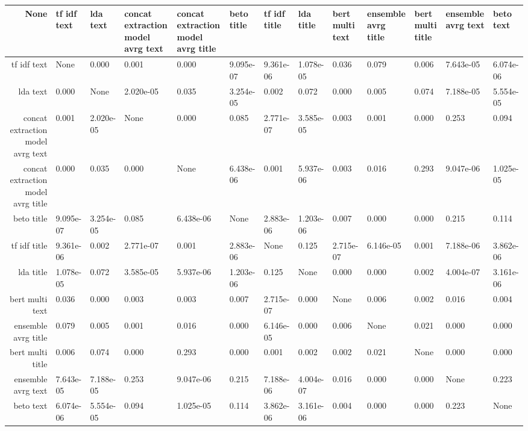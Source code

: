 \begin{tabular}{|r|l|l|l|l|l|l|l|l|l|l|l|l|}
  \hline
  None & tf idf text & lda text & concat extraction model avrg text & concat extraction model avrg title & beto title & tf idf title & lda title & bert multi text & ensemble avrg title & bert multi title & ensemble avrg text & beto text \\ 
  \hline
  tf idf text & None & 0.000 & 0.001 & 0.000 & 9.095e-07 & 9.361e-06 & 1.078e-05 & 0.036 & 0.079 & 0.006 & 7.643e-05 & 6.074e-06 \\ 
  \hline
  lda text & 0.000 & None & 2.020e-05 & 0.035 & 3.254e-05 & 0.002 & 0.072 & 0.000 & 0.005 & 0.074 & 7.188e-05 & 5.554e-05 \\ 
  \hline
  concat extraction model avrg text & 0.001 & 2.020e-05 & None & 0.000 & 0.085 & 2.771e-07 & 3.585e-05 & 0.003 & 0.001 & 0.000 & 0.253 & 0.094 \\ 
  \hline
  concat extraction model avrg title & 0.000 & 0.035 & 0.000 & None & 6.438e-06 & 0.001 & 5.937e-06 & 0.003 & 0.016 & 0.293 & 9.047e-06 & 1.025e-05 \\ 
  \hline
  beto title & 9.095e-07 & 3.254e-05 & 0.085 & 6.438e-06 & None & 2.883e-06 & 1.203e-06 & 0.007 & 0.000 & 0.000 & 0.215 & 0.114 \\ 
  \hline
  tf idf title & 9.361e-06 & 0.002 & 2.771e-07 & 0.001 & 2.883e-06 & None & 0.125 & 2.715e-07 & 6.146e-05 & 0.001 & 7.188e-06 & 3.862e-06 \\ 
  \hline
  lda title & 1.078e-05 & 0.072 & 3.585e-05 & 5.937e-06 & 1.203e-06 & 0.125 & None & 0.000 & 0.000 & 0.002 & 4.004e-07 & 3.161e-06 \\ 
  \hline
  bert multi text & 0.036 & 0.000 & 0.003 & 0.003 & 0.007 & 2.715e-07 & 0.000 & None & 0.006 & 0.002 & 0.016 & 0.004 \\ 
  \hline
  ensemble avrg title & 0.079 & 0.005 & 0.001 & 0.016 & 0.000 & 6.146e-05 & 0.000 & 0.006 & None & 0.021 & 0.000 & 0.000 \\ 
  \hline
  bert multi title & 0.006 & 0.074 & 0.000 & 0.293 & 0.000 & 0.001 & 0.002 & 0.002 & 0.021 & None & 0.000 & 0.000 \\ 
  \hline
  ensemble avrg text & 7.643e-05 & 7.188e-05 & 0.253 & 9.047e-06 & 0.215 & 7.188e-06 & 4.004e-07 & 0.016 & 0.000 & 0.000 & None & 0.223 \\ 
  \hline
  beto text & 6.074e-06 & 5.554e-05 & 0.094 & 1.025e-05 & 0.114 & 3.862e-06 & 3.161e-06 & 0.004 & 0.000 & 0.000 & 0.223 & None \\ 
  \hline
\end{tabular}
